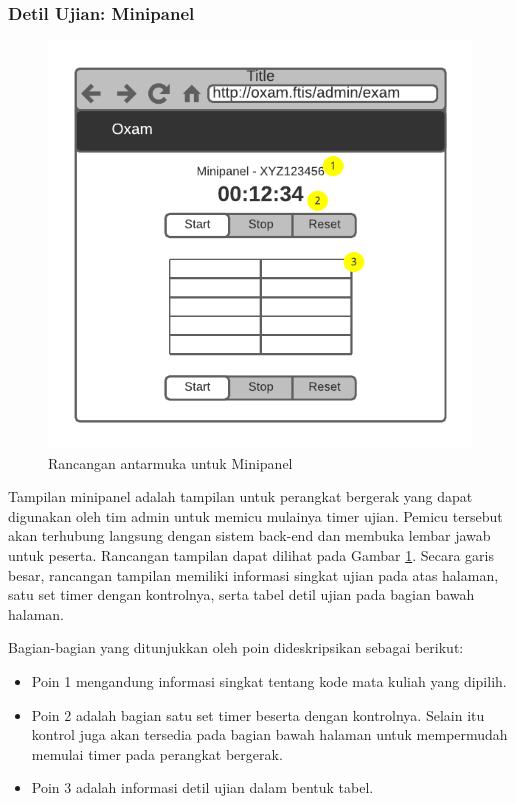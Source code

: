 \subsubsection{Detil Ujian: Minipanel}
    \begin{figure}
        \centering
        \includegraphics{Gambar/mockups/Mockup--Admin - Minipanel.pdf}
        \caption{Rancangan antarmuka untuk Minipanel}
        \label{fig:mockup_admin_minipanel}
    \end{figure}
    Tampilan minipanel adalah tampilan untuk perangkat bergerak yang dapat
    digunakan oleh tim admin untuk memicu mulainya timer ujian. Pemicu tersebut
    akan terhubung langsung dengan sistem back-end dan membuka lembar jawab
    untuk peserta. Rancangan tampilan dapat dilihat pada Gambar
    \ref{fig:mockup_admin_minipanel}. Secara garis besar, rancangan tampilan
    memiliki informasi singkat ujian pada atas halaman, satu set timer dengan
    kontrolnya, serta tabel detil ujian pada bagian bawah halaman.
    
    Bagian-bagian yang ditunjukkan oleh poin dideskripsikan sebagai berikut:
    \begin{itemize}
        \item Poin 1 mengandung informasi singkat tentang kode mata kuliah yang
        dipilih.
        
        \item Poin 2 adalah bagian satu set timer beserta dengan 
            kontrolnya. Selain itu
            kontrol juga akan tersedia pada bagian bawah halaman untuk
            mempermudah memulai timer pada perangkat bergerak.
            
        \item Poin 3 adalah informasi detil ujian dalam bentuk tabel.
    \end{itemize}
    
